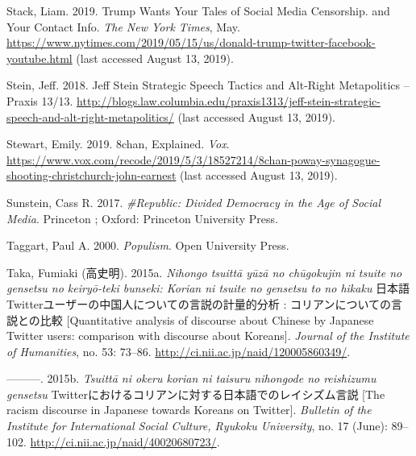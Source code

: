 \documentclass[10pt,british,A4paper,twoside]{memoir}
\begin{document}
\hypertarget{ref-stack_trump_2019}{}
Stack, Liam. 2019. Trump Wants Your Tales of Social Media Censorship.
and Your Contact Info. \emph{The New York Times}, May.
\url{https://www.nytimes.com/2019/05/15/us/donald-trump-twitter-facebook-youtube.html} (last accessed August 13, 2019).

\hypertarget{ref-stein_jeff_2018}{}
Stein, Jeff. 2018. Jeff Stein Strategic Speech Tactics and Alt-Right
Metapolitics -- Praxis 13/13.
\url{http://blogs.law.columbia.edu/praxis1313/jeff-stein-strategic-speech-and-alt-right-metapolitics/} (last accessed August 13, 2019).

\hypertarget{ref-stewart_8chan_2019}{}
Stewart, Emily. 2019. 8chan, Explained. \emph{Vox}.
\url{https://www.vox.com/recode/2019/5/3/18527214/8chan-poway-synagogue-shooting-christchurch-john-earnest} (last accessed August 13, 2019).

\hypertarget{ref-sunstein_republic:_2017}{}
Sunstein, Cass R. 2017. \emph{\#Republic: Divided Democracy in the Age
of Social Media}. Princeton ; Oxford: Princeton University Press.

\hypertarget{ref-taggart_populism_2000}{}
Taggart, Paul A. 2000. \emph{Populism}. Open University Press.

\hypertarget{ref-taka_twitter_2015}{}
Taka, Fumiaki (高史明). 2015a.
\emph{Nihongo tsuittā yūzā no chūgokujin ni tsuite no gensetsu no keiryō-teki bunseki: Korian ni tsuite no gensetsu to no hikaku} 日本語Twitterユーザーの中国人についての言説の計量的分析 : コリアンについての言説との比較 [Quantitative analysis of discourse about Chinese by Japanese Twitter users: comparison with discourse about Koreans]. \emph{Journal of the Institute of Humanities}, no. 53: 73--86.
\url{http://ci.nii.ac.jp/naid/120005860349/}.

\hypertarget{ref-taka_twitter_2015-1}{}
---------. 2015b.
\emph{Tsuittā ni okeru korian ni taisuru nihongode no reishizumu gensetsu} Twitterにおけるコリアンに対する日本語でのレイシズム言説 [The racism discourse in Japanese towards Koreans on Twitter].
\emph{Bulletin of the Institute for International Social Culture, Ryukoku University}, no. 17 (June): 89--102.
\url{http://ci.nii.ac.jp/naid/40020680723/}.
\end{document}
